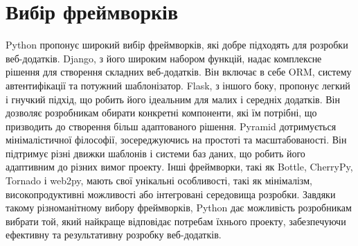 \section{Вибір фреймворків}
\label{sec:frameworks}

Python пропонує широкий вибір фреймворків, які добре підходять для розробки веб-додатків. Django, з його широким набором функцій, надає комплексне рішення для створення складних веб-додатків. Він включає в себе ORM, систему автентифікації та потужний шаблонізатор. Flask, з іншого боку, пропонує легкий і гнучкий підхід, що робить його ідеальним для малих і середніх додатків. Він дозволяє розробникам обирати конкретні компоненти, які їм потрібні, що призводить до створення більш адаптованого рішення. Pyramid дотримується мінімалістичної філософії, зосереджуючись на простоті та масштабованості. Він підтримує різні движки шаблонів і системи баз даних, що робить його адаптивним до різних вимог проекту. Інші фреймворки, такі як Bottle, CherryPy, Tornado і web2py, мають свої унікальні особливості, такі як мінімалізм, високопродуктивні можливості або інтегровані середовища розробки. Завдяки такому різноманітному вибору фреймворків, Python дає можливість розробникам вибрати той, який найкраще відповідає потребам їхнього проекту, забезпечуючи ефективну та результативну розробку веб-додатків.





